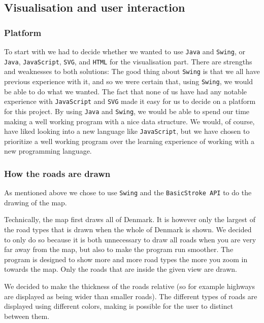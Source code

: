 \documentclass[a4paper,11pt]{article}
\begin{document}
\subsection{Visualisation and user interaction}

\subsubsection{Platform}
To start with we had to decide whether we wanted to use \texttt{Java} and \texttt{Swing}, or \texttt{Java}, \texttt{JavaScript}, \texttt{SVG}, and \texttt{HTML} for the visualisation part. There are strengths and weaknesses to both solutions: The good thing about \texttt{Swing} is that we all have previous experience with it, and so we were certain that, using \texttt{Swing}, we would be able to do what we wanted. 
The fact that none of us have had any notable experience with \texttt{JavaScript} and \texttt{SVG} made it easy for us to decide on a platform for this project. By using \texttt{Java} and \texttt{Swing}, we would be able to spend our time making a well working program with a nice data structure. We would, of course, have liked looking into a new language like \texttt{JavaScript}, but we have chosen to prioritize a well working program over the learning experience of working with a new programming language.

\subsubsection{How the roads are drawn}
As mentioned above we chose to use \texttt{Swing} and the \texttt{BasicStroke API} to do the drawing of the map. 

Technically, the map first draws all of Denmark. It is however only the largest of the road types that is drawn when the whole of Denmark is shown. We decided to only do so because it is both unnecessary to draw all roads when you are very far away from the map, but also to make the program run smoother. The program is designed to show more and more road types the more you zoom in towards the map. Only the roads that are inside the given view are drawn.

We decided to make the thickness of the roads relative (so for example highways are displayed as being wider than smaller roads). The different types of roads are displayed using different colors, making is possible for the user to distinct between them.
\end{document}
